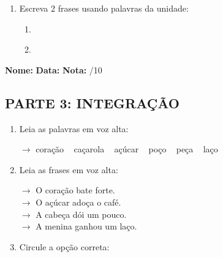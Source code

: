 \begin{exercicio}
\begin{enumerate}[resume]
  \item Escreva 2 frases usando palavras da unidade:
  \begin{enumerate}[label=\alph*)]
    \item \underline{\hspace{8cm}}
    \item \underline{\hspace{8cm}}
  \end{enumerate}

\end{enumerate}

\end{exercicio}



\begin{exercicio}

\noindent\textbf{Nome:} \underline{\hspace{3.2cm}} \quad \textbf{Data:} \underline{\hspace{1.6cm}} \quad \textbf{Nota:} \underline{\hspace{0.9cm}}/10


\subsection*{PARTE 3: INTEGRAÇÃO}

\begin{enumerate}[resume]

  \item Leia as palavras em voz alta:
  \begin{center}
  $\rightarrow$ coração ~ caçarola ~ açúcar ~ poço ~ peça ~ laço
  \end{center}

  \item Leia as frases em voz alta:
  \begin{center}
  $\rightarrow$ O coração bate forte.\\
  $\rightarrow$ O açúcar adoça o café.\\
  $\rightarrow$ A cabeça dói um pouco.\\
  $\rightarrow$ A menina ganhou um laço.\\
  \end{center}

  \item Circule a opção correta:
  \begin{enumerate}[label=(\alph*)]


\end{enumerate}
\end{enumerate}
\end{exercicio}
